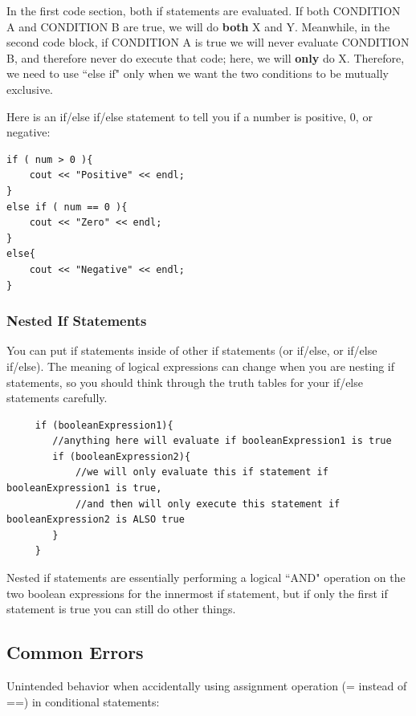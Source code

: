  In the first code section, both if statements are evaluated. If both CONDITION A and CONDITION B are true, we will do \textbf{both} X and Y. Meanwhile, in the second code block, if CONDITION A is true we will never evaluate CONDITION B, and therefore never do execute that code; here, we will \textbf{only} do X. Therefore, we need to use ``else if" only when we want the two conditions to be mutually exclusive.

 \begin{example}
     Here is an if/else if/else statement to tell you if a number is positive, 0, or negative:
\begin{verbatim}
if ( num > 0 ){
	cout << "Positive" << endl;
}
else if ( num == 0 ){
	cout << "Zero" << endl;
}
else{
	cout << "Negative" << endl;
}
\end{verbatim}
 \end{example}

 \subsubsection{Nested If Statements}
 You can put if statements inside of other if statements (or if/else, or if/else if/else). The meaning of logical expressions can change when you are nesting if statements, so you should think through the truth tables for your if/else statements carefully. 

 \begin{verbatim}
     if (booleanExpression1){
        //anything here will evaluate if booleanExpression1 is true
        if (booleanExpression2){
            //we will only evaluate this if statement if booleanExpression1 is true, 
            //and then will only execute this statement if booleanExpression2 is ALSO true
        }
     }
 \end{verbatim}

 Nested if statements are essentially performing a logical ``AND" operation on the two boolean expressions for the innermost if statement, but if only the first if statement is true you can still do other things. 

\subsection{Common Errors}
Unintended behavior when accidentally using assignment operation (= instead of ==) in conditional statements:


